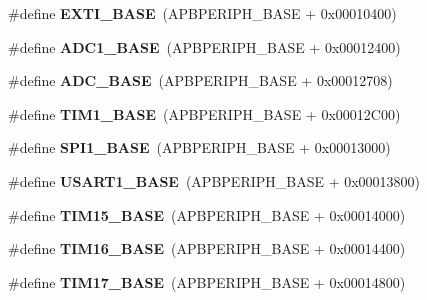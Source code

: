 \begin{DoxyCompactItemize}
\#define {\bfseries E\+X\+T\+I\+\_\+\+B\+A\+SE}~(A\+P\+B\+P\+E\+R\+I\+P\+H\+\_\+\+B\+A\+SE + 0x00010400)
\item 
\mbox{\label{group___peripheral__memory__map_ga695c9a2f892363a1c942405c8d351b91}} 
\#define {\bfseries A\+D\+C1\+\_\+\+B\+A\+SE}~(A\+P\+B\+P\+E\+R\+I\+P\+H\+\_\+\+B\+A\+SE + 0x00012400)
\item 
\mbox{\label{group___peripheral__memory__map_gad06cb9e5985bd216a376f26f22303cd6}} 
\#define {\bfseries A\+D\+C\+\_\+\+B\+A\+SE}~(A\+P\+B\+P\+E\+R\+I\+P\+H\+\_\+\+B\+A\+SE + 0x00012708)
\item 
\mbox{\label{group___peripheral__memory__map_gaf8aa324ca5011b8173ab16585ed7324a}} 
\#define {\bfseries T\+I\+M1\+\_\+\+B\+A\+SE}~(A\+P\+B\+P\+E\+R\+I\+P\+H\+\_\+\+B\+A\+SE + 0x00012\+C00)
\item 
\mbox{\label{group___peripheral__memory__map_ga50cd8b47929f18b05efbd0f41253bf8d}} 
\#define {\bfseries S\+P\+I1\+\_\+\+B\+A\+SE}~(A\+P\+B\+P\+E\+R\+I\+P\+H\+\_\+\+B\+A\+SE + 0x00013000)
\item 
\mbox{\label{group___peripheral__memory__map_ga86162ab3f740db9026c1320d46938b4d}} 
\#define {\bfseries U\+S\+A\+R\+T1\+\_\+\+B\+A\+SE}~(A\+P\+B\+P\+E\+R\+I\+P\+H\+\_\+\+B\+A\+SE + 0x00013800)
\item 
\mbox{\label{group___peripheral__memory__map_ga7ab42ce1846930569d742d339b554078}} 
\#define {\bfseries T\+I\+M15\+\_\+\+B\+A\+SE}~(A\+P\+B\+P\+E\+R\+I\+P\+H\+\_\+\+B\+A\+SE + 0x00014000)
\item 
\mbox{\label{group___peripheral__memory__map_ga16c97093a531d763b0794c3e6d09e1bf}} 
\#define {\bfseries T\+I\+M16\+\_\+\+B\+A\+SE}~(A\+P\+B\+P\+E\+R\+I\+P\+H\+\_\+\+B\+A\+SE + 0x00014400)
\item 
\mbox{\label{group___peripheral__memory__map_gaffbedbe30e8c4cffdea326d6c1800574}} 
\#define {\bfseries T\+I\+M17\+\_\+\+B\+A\+SE}~(A\+P\+B\+P\+E\+R\+I\+P\+H\+\_\+\+B\+A\+SE + 0x00014800)

\end{DoxyCompactItemize}
